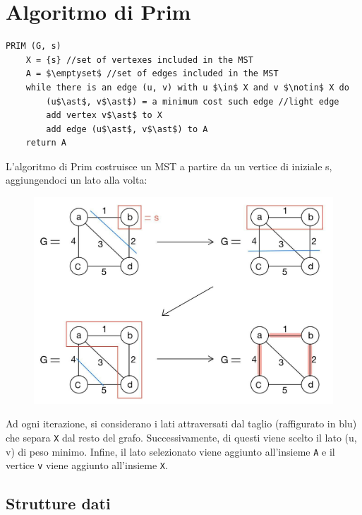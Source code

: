 \section{Algoritmo di Prim}
\begin{lstlisting}[mathescape=true]
PRIM (G, s)
	X = {s} //set of vertexes included in the MST
	A =	$\emptyset$ //set of edges included in the MST
	while there is an edge (u, v) with u $\in$ X and v $\notin$ X do
		(u$\ast$, v$\ast$) = a minimum cost such edge //light edge
		add vertex v$\ast$ to X
		add edge (u$\ast$, v$\ast$) to A
	return A	

\end{lstlisting}
L'algoritmo di Prim costruisce un MST a partire da un vertice di iniziale s, aggiungendoci un lato alla volta:
\begin{figure}[H]
	\centering\includegraphics[width=15cm]{Img/prim.jpg}
\end{figure}
Ad ogni iterazione, si considerano i lati attraversati dal taglio (raffigurato in blu) che separa \texttt{X} dal resto del grafo. Successivamente, di questi viene scelto il lato (u, v) di peso minimo. Infine, il lato selezionato viene aggiunto all'insieme \texttt{A} e il vertice \texttt{v} viene aggiunto all'insieme \texttt{X}.

\subsection{Strutture dati}
